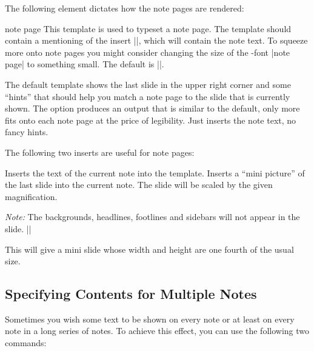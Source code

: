 The following element dictates how the note pages are rendered:

\begin{element}{note page}\yes\yes\yes
  This template is used to typeset a note page.  The template should contain a mentioning of the insert |\insertnote|, which will contain the note text. To squeeze more onto note pages you might consider changing the size of the \beamer-font |note page| to something small. The default is |\small|.
  \begin{templateoptions}
    The default template shows the last slide in the upper right corner and some ``hints'' that should help you match a note page to the slide that is currently shown.
    The option produces an output that is similar to the default, only more fits onto each note page at the price of legibility.
    Just inserts the note text, no fancy hints.
  \end{templateoptions}
  The following two inserts are useful for note pages:
  \begin{itemize}
    \iteminsert{\insertnote}
    Inserts the text of the current note into the template.
    \iteminsert{\insertslideintonotes}
    Inserts a ``mini picture'' of the last slide into the current note. The slide will be scaled by the given magnification.

    \emph{Note:} The backgrounds, headlines, footlines and sidebars will not appear in the slide.
    \example
    ||

    This will give a mini slide whose width and height are one fourth of the usual size.
  \end{itemize}
\end{element}


\subsection{Specifying Contents for Multiple Notes}

Sometimes you wish some text to be shown on every note or at least on every note in a long series of notes. To achieve this effect, you can use the following two commands:

